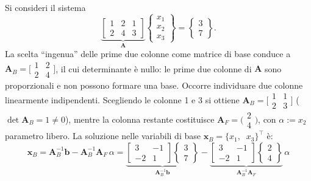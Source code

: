 \begin{esempio}
	Si consideri il sistema
	\begin{equation}
		\underbrace{\begin{bmatrix} 1 & 2 & 1 \\ 2 & 4 & 3 \end{bmatrix}}_{\bm{A}}
		\begin{Bmatrix} x_1 \\ x_2 \\ x_3 \end{Bmatrix}
		= \begin{Bmatrix} 3 \\ 7 \end{Bmatrix}.
	\end{equation}
	La scelta ``ingenua'' delle prime due colonne come matrice di base
	conduce a $\bm{A}_B=\bigl[\begin{smallmatrix}1 & 2\\ 2 &
		4\end{smallmatrix}\bigr]$, il cui determinante \`e nullo: le prime
	due colonne di $\bm{A}$ sono proporzionali e non possono formare una
	base. Occorre individuare due colonne linearmente indipendenti.
	Scegliendo le colonne 1 e 3 si ottiene
	$\bm{A}_B=\bigl[\begin{smallmatrix}1 & 1\\ 2 &
		3\end{smallmatrix}\bigr]$ ($\det\bm{A}_B=1\neq 0$), mentre la
	colonna restante costituisce
	$\bm{A}_F=\bigl(\begin{smallmatrix}2\\ 4\end{smallmatrix}\bigr)$,
	con $\alpha:=x_2$ parametro libero. La soluzione nelle variabili di
	base $\bm{x}_B=\{x_1,\;\;x_3\}^\top$ \`e:
	\begin{equation}
		\bm{x}_B = \bm{A}_B^{-1}\bm{b} - \bm{A}_B^{-1}\bm{A}_F\,\alpha
		= \underbrace{\begin{bmatrix} 3 & -1 \\ -2 & 1 \end{bmatrix}
			\begin{Bmatrix} 3 \\ 7 \end{Bmatrix}}_{\bm{A}_B^{-1}\bm{b}}
		- \underbrace{\begin{bmatrix} 3 & -1 \\ -2 & 1 \end{bmatrix}
			\begin{Bmatrix} 2 \\ 4 \end{Bmatrix}}_{\bm{A}_B^{-1}\bm{A}_F}\,\alpha

\end{equation}
\end{esempio}
